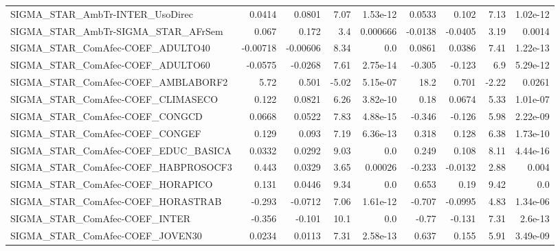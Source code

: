 \begin{tabular}{lrrrrrrrr}
SIGMA\_STAR\_AmbTr-INTER\_UsoDirec        &      0.0414 &       0.0801 &    7.07 & 1.53e-12 &     0.0533 &       0.102 &         7.13 &      1.02e-12 \\
SIGMA\_STAR\_AmbTr-SIGMA\_STAR\_AFrSem     &       0.067 &        0.172 &     3.4 & 0.000666 &    -0.0138 &     -0.0405 &         3.19 &        0.0014 \\
SIGMA\_STAR\_ComAfec-COEF\_ADULTO40       &    -0.00718 &     -0.00606 &    8.34 &      0.0 &     0.0861 &      0.0386 &         7.41 &      1.22e-13 \\
SIGMA\_STAR\_ComAfec-COEF\_ADULTO60       &     -0.0575 &      -0.0268 &    7.61 & 2.75e-14 &     -0.305 &      -0.123 &          6.9 &      5.29e-12 \\
SIGMA\_STAR\_ComAfec-COEF\_AMBLABORF2     &        5.72 &        0.501 &   -5.02 & 5.15e-07 &       18.2 &       0.701 &        -2.22 &        0.0261 \\
SIGMA\_STAR\_ComAfec-COEF\_CLIMASECO      &       0.122 &       0.0821 &    6.26 & 3.82e-10 &       0.18 &      0.0674 &         5.33 &      1.01e-07 \\
SIGMA\_STAR\_ComAfec-COEF\_CONGCD         &      0.0668 &       0.0522 &    7.83 & 4.88e-15 &     -0.346 &      -0.126 &         5.98 &      2.22e-09 \\
SIGMA\_STAR\_ComAfec-COEF\_CONGEF         &       0.129 &        0.093 &    7.19 & 6.36e-13 &      0.318 &       0.128 &         6.38 &      1.73e-10 \\
SIGMA\_STAR\_ComAfec-COEF\_EDUC\_BASICA    &      0.0332 &       0.0292 &    9.03 &      0.0 &      0.249 &       0.108 &         8.11 &      4.44e-16 \\
SIGMA\_STAR\_ComAfec-COEF\_HABPROSOCF3    &       0.443 &       0.0329 &    3.65 &  0.00026 &     -0.233 &     -0.0132 &         2.88 &         0.004 \\
SIGMA\_STAR\_ComAfec-COEF\_HORAPICO       &       0.131 &       0.0446 &    9.34 &      0.0 &      0.653 &        0.19 &         9.42 &           0.0 \\
SIGMA\_STAR\_ComAfec-COEF\_HORASTRAB      &      -0.293 &      -0.0712 &    7.06 & 1.61e-12 &     -0.707 &     -0.0995 &         4.83 &      1.34e-06 \\
SIGMA\_STAR\_ComAfec-COEF\_INTER          &      -0.356 &       -0.101 &    10.1 &      0.0 &      -0.77 &      -0.131 &         7.31 &       2.6e-13 \\
SIGMA\_STAR\_ComAfec-COEF\_JOVEN30        &      0.0234 &       0.0113 &    7.31 & 2.58e-13 &      0.637 &       0.155 &         5.91 &      3.49e-09 \\

\end{tabular}
